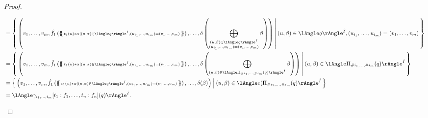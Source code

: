 \begin{proof}
\begin{itemize}
\begin{minipage}{\linewidth}
\begin{align*}
				 & =\set{\left(v_1,\dots,v_m, \hat
				f_1\left(\mset{\scriptstyle t_1(u)*\alpha\mid (u,\alpha)\in\ansem{\hat
					I}{q},
				(u_{i_1},\dots,u_{i_m})=(v_1,\dots,v_m)}\right),\dots,\delta\left(
				\bigoplus_{\substack{(u,\beta)\in\ansem{\hat I}{q}                                      \\(u_{i_1},\dots,u_{i_m})=(v_1,\dots,v_m)}}\beta
				\right)\right)
				\:\middle|\:
				(u,\beta)\in \ansem{\hat I}{q}, (u_{i_1},\dots,
				u_{i_m})=(v_1,\dots,v_m)}                                                                  \\
				 & =\set{\left(v_1,\dots,v_m, \hat
				f_1\left(\mset{\scriptstyle t_1(u)*\alpha\mid (u,\alpha)\in\ansem{\hat
					I}{q},
				(u_{i_1},\dots,u_{i_m})=(v_1,\dots,v_m)}\right),\dots,\delta
				\left(
        \bigoplus_{(u,\beta)\in\ansem{\hat I}{\Pi_{\#i_1,\dots,\#i_m}(q)}}\beta
				\right)
				\right)
				\:\middle|\:
				(u,\beta)\in \ansem{\hat
				I}{\Pi_{\#i_1,\dots,\#i_m}(q)}}                                                            \\
				 & =\set{\left(v_1,\dots,v_m, \hat
				f_1\left(\mset{\scriptstyle t_1(u)*\alpha\mid (u,\alpha)\in\ansem{\hat
					I}{q},
				(u_{i_1},\dots,u_{i_m})=(v_1,\dots,v_m)}\right),\dots,\delta(\beta)\right)
				\:\middle|\:
				(u,\beta)\in \ansem{\hat
				I}{\epsilon(\Pi_{\#i_1,\dots,\#i_m}(q)}}                                                   \\
				 & =\ansem{\hat
         I}{\gamma_{i_1,\dots,i_m}[t_1:f_1,\dots,t_n:f_n](q)}. \qedhere
			\end{align*}
    \end{minipage}
	\end{itemize}
\end{proof}
